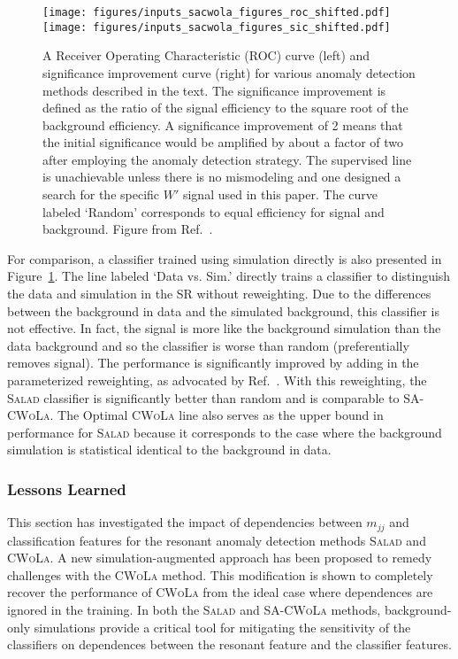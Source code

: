 \documentclass[a4paper,11pt]{article}
\begin{document}
\begin{figure}[h!]
\centering
\texttt{[image: figures/inputs\_sacwola\_figures\_roc\_shifted.pdf]}
\texttt{[image: figures/inputs\_sacwola\_figures\_sic\_shifted.pdf]}
\caption{A Receiver Operating Characteristic (ROC) curve (left) and significance improvement curve (right) for various anomaly detection methods described in the text.   The significance improvement is defined as the ratio of the signal efficiency to the square root of the background efficiency.  A significance improvement of 2 means that the initial significance would be amplified by about a factor of two after employing the anomaly detection strategy.  The supervised line is unachievable unless there is no mismodeling and one designed a search for the specific $W'$ signal used in this paper.  The curve labeled `Random' corresponds to equal efficiency for signal and background.  Figure from Ref.~\cite{1815227}.}
\label{fig:roc}
\end{figure}

For comparison, a classifier trained using simulation directly is also presented in Figure~\ref{fig:roc}.  The line labeled `Data vs. Sim.' directly trains a classifier to distinguish the data and simulation in the SR without reweighting.  Due to the differences between the background in data and the simulated background, this classifier is not effective.  In fact, the signal is more like the background simulation than the data background and so the classifier is worse than random (preferentially removes signal).  The performance is significantly improved by adding in the parameterized reweighting, as advocated by Ref.~\cite{Andreassen:2020nkr}.  With this reweighting, the \textsc{Salad} classifier is significantly better than random and is comparable to SA-\textsc{CWoLa}.  The Optimal \textsc{CWoLa} line also serves as the upper bound in performance for \textsc{Salad} because it corresponds to the case where the background simulation is statistical identical to the background in data.

\subsubsection{Lessons Learned}

This section has investigated the impact of dependencies between $m_{jj}$ and classification features for the resonant anomaly detection methods \textsc{Salad} and \textsc{CWoLa}. A new simulation-augmented approach has been proposed to remedy challenges with the \textsc{CWoLa} method.  This modification is shown to completely recover the performance of \textsc{CWoLa} from the ideal case where dependences are ignored in the training.  In both the \textsc{Salad} and SA-\textsc{CWoLa} methods, background-only simulations provide a critical tool for mitigating the sensitivity of the classifiers on dependences between the resonant feature and the classifier features.  
    
\end{document}
